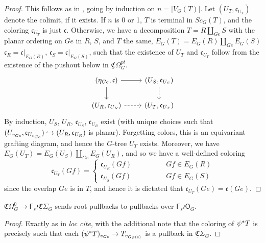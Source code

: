 \documentclass[a4paper,10pt
,draft
]{article}%
\renewcommand{\phi}{\varphi}
\newcommand{\UC}{\underline{\mathfrak C}}
\renewcommand{\1}{\ensuremath{\mathbb{id}}}
\begin{document}
\begin{proof}
      This follows as in \cite[Prop. 3.41]{BP17}, going by induction on $n=|V_G(T)|$.
      Let $(U_T,\mathfrak c_{U_T})$ denote the colimit, if it exists.
      If $n$ is 0 or 1, $T$ is terminal in $Sc_G(T)$, and the coloring $\mathfrak c_{U_T}$ is just $\mathfrak c$.
      Otherwise, we have a decomposition $T = R \amalg_{Ge} S$ with
      the planar ordering on $Ge$ in $R$, $S$, and $T$ the same,
      $E_G(T) = E_G(R) \amalg_{Ge} E_G(S)$
      $\mathfrak c_{R} = \mathfrak c|_{E_G(R)}$,
      $\mathfrak c_{S} = \mathfrak c|_{E_G(S)}$,
      such that
      the existence of $U_T$ and $\mathfrak c_{U_T}$ follow from the existence of the pushout below in $\underline{\mathfrak C}\Omega_G^{pt}$.
      \begin{equation}
            \begin{tikzcd}
                  (\eta_{Ge}, \mathfrak c) \arrow[d] \arrow[r]
                  &
                  (U_S, \mathfrak c_{U_S}) \arrow[d, dashed]
                  \\
                  (U_R, \mathfrak c_{U_R}) \arrow[r, dashed]
                  &
                  (U_T, \mathfrak c_{U_T})
            \end{tikzcd}
      \end{equation}
      By induction, $U_S$, $U_R$, $\mathfrak c_{U_S}$, $\mathfrak c_{U_R}$ exist
      (with unique choices such that $(U_{v_{Ge}}, \mathfrak c_{U_{v_{Ge}}}) \hookrightarrow(U_R, \mathfrak c_{U_R})$ is planar).
      Forgetting colors, this is an equivariant grafting diagram, and hence the $G$-tree $U_T$ exists.
      Moreover, we have $E_G(U_T) = E_G(U_S) \amalg_{Ge} E_G(U_R)$, and so we have a well-defined coloring
      \begin{equation}
            \mathfrak c_{U_T}(Gf) =
            \begin{cases}
                  \mathfrak c_{U_R}(Gf) \qquad \qquad & Gf \in E_G(R) \\
                  \mathfrak c_{U_S}(Gf) & Gf \in E_G(S)
            \end{cases}
      \end{equation}
      since the overlap $Ge$ is in $T$, and hence it is dictated that $\mathfrak c_{U_T}(Ge) = \mathfrak c (Ge)$.
\end{proof}

\begin{lemma}[{cf. \cite[Lemma 3.63]{BP17}}]
      $\underline{\mathfrak C}\Omega_G^0 \to \mathsf F_s \wr \underline{\mathfrak C}\Sigma_G$
      sends root pullbacks to pullbacks over $\mathsf F_s \wr \mathsf O_G$.
\end{lemma}
\begin{proof}
      Exactly as in \textit{loc cite}, with the additional note that
      the coloring of $\psi^{\**}T$ is precisely such that each $(\psi^{\**}T)_{v_{Ge}} \to T_{v_{G\phi(e)}}$
      is a pullback in $\UC \Sigma_G$.
\end{proof}
\end{document}
